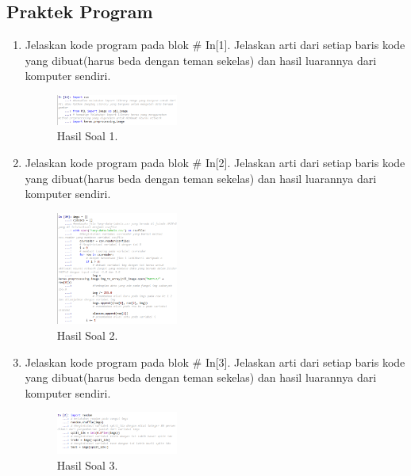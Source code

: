 \subsection{Praktek Program}
\begin{enumerate}
	\item  Jelaskan kode program pada blok \# In[1]. Jelaskan arti dari setiap baris kode yang dibuat(harus beda dengan teman sekelas) dan hasil luarannya dari komputer sendiri.
	\hfill\break
	
	\begin{figure}[H]
	\centering
		\includegraphics[width=4cm]{figures/1174077/7/praktek_1.PNG}
		\caption{Hasil Soal 1.}
	\end{figure}

	\item  Jelaskan kode program pada blok \# In[2]. Jelaskan arti dari setiap baris kode yang dibuat(harus beda dengan teman sekelas) dan hasil luarannya dari komputer sendiri.
	\hfill\break
	
	\begin{figure}[H]
	\centering
		\includegraphics[width=4cm]{figures/1174077/7/praktek_2.PNG}
		\caption{Hasil Soal 2.}
	\end{figure}

	\item Jelaskan kode program pada blok \# In[3]. Jelaskan arti dari setiap baris kode yang dibuat(harus beda dengan teman sekelas) dan hasil luarannya dari komputer sendiri.
	\hfill\break
	
	\begin{figure}[H]
	\centering
		\includegraphics[width=4cm]{figures/1174077/7/praktek_3.PNG}
		\caption{Hasil Soal 3.}
	\end{figure}


\end{enumerate}
